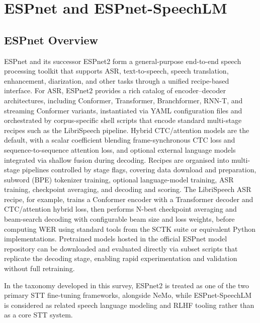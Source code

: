 \documentclass[conference]{IEEEtran}
\begin{document}
\section{ESPnet and ESPnet-SpeechLM}
%
%
\label{sec:espnet}

\subsection{ESPnet Overview}

ESPnet and its successor ESPnet2 form a general-purpose end-to-end speech processing toolkit that supports ASR, text-to-speech, speech translation, enhancement, diarization, and other tasks through a unified recipe-based interface.
For ASR, ESPnet2 provides a rich catalog of encoder--decoder architectures, including Conformer, Transformer, Branchformer, RNN-T, and streaming Conformer variants, instantiated via YAML configuration files and orchestrated by corpus-specific shell scripts that encode standard multi-stage recipes such as the LibriSpeech pipeline.
Hybrid CTC/attention models are the default, with a scalar coefficient blending frame-synchronous CTC loss and sequence-to-sequence attention loss, and optional external language models integrated via shallow fusion during decoding.
Recipes are organised into multi-stage pipelines controlled by stage flags, covering data download and preparation, subword (BPE) tokenizer training, optional language-model training, ASR training, checkpoint averaging, and decoding and scoring.
The LibriSpeech ASR recipe, for example, trains a Conformer encoder with a Transformer decoder and CTC/attention hybrid loss, then performs N-best checkpoint averaging and beam-search decoding with configurable beam size and loss weights, before computing WER using standard tools from the SCTK suite or equivalent Python implementations.
Pretrained models hosted in the official ESPnet model repository can be downloaded and evaluated directly via subset scripts that replicate the decoding stage, enabling rapid experimentation and validation without full retraining.

In the taxonomy developed in this survey, ESPnet2 is treated as one of the two primary STT fine-tuning frameworks, alongside NeMo, while ESPnet-SpeechLM is considered as related speech language modeling and RLHF tooling rather than as a core STT system.
\end{document}
